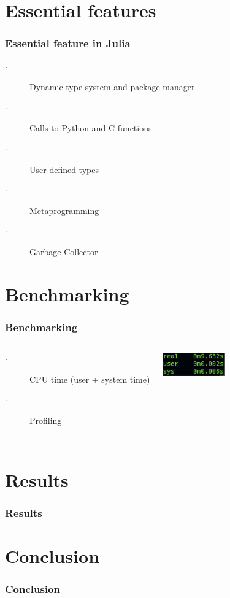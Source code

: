 \documentclass[t, aspectratio=169]{beamer}
\begin{document}
	\section{Essential features}
	\begin{frame}
		\frametitle{Essential feature in Julia}
		\begin{description}
			\item[$\cdot$] Dynamic type system and package manager
			\item[$\cdot$] Calls to Python and C functions
			\item[$\cdot$] User-defined types
			\item[$\cdot$] Metaprogramming
			\item[$\cdot$] Garbage Collector
		\end{description}
	\end{frame}
	\section{Benchmarking}
	\begin{frame}
		\frametitle{Benchmarking}
		\begin{columns}[c] %
		\begin{description}
			\item[$\cdot$] CPU time (user + system time)
			\item[$\cdot$] Profiling
		\end{description}
			\includegraphics[height=1cm]{img/time.png}
		\end{columns}
	\end{frame}
	\section{Results}
	\begin{frame}
		\frametitle{Results}
	\end{frame}
	\section{Conclusion}
	\begin{frame}
		\frametitle{Conclusion}
	\end{frame}
\end{document}
